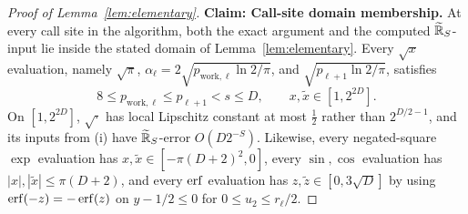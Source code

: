 \begin{proof}[Proof of Lemma~\ref{lem:elementary}]
\textbf{Claim: Call-site domain membership.}
At every call site in the algorithm, both the exact argument and the computed $\widetilde{\mathbb{R}}_S$-input lie inside the stated domain of Lemma~\ref{lem:elementary}. Every $\sqrt{x}$ evaluation, namely $\sqrt{\pi}$, $\alpha_\ell = 2\sqrt{p_{\mathrm{work},\ell}\ln 2 / \pi}$, and $\sqrt{p_{\ell+1}\ln 2 / \pi}$, satisfies
\[
  8 \le p_{\mathrm{work},\ell} \le p_{\ell+1} < s \le D, \qquad x, \tilde{x} \in [1, 2^{2D}].
\]
On $[1, 2^{2D}]$, $\sqrt{\cdot}$ has local Lipschitz constant at most $\frac{1}{2}$ rather than $2^{D/2-1}$, and its inputs from (i) have $\widetilde{\mathbb{R}}_S$-error $O(D 2^{-S})$. Likewise, every negated-square $\exp$ evaluation has $x, \tilde{x} \in [-\pi(D+2)^2, 0]$, every $\sin, \cos$ evaluation has $|x|, |\tilde{x}| \le \pi(D+2)$, and every $\operatorname{erf}$ evaluation has $z, \tilde{z} \in [0, 3\sqrt{D}]$ by using $\operatorname{erf}(-z) = -\operatorname{erf}(z)$ on $y - 1/2 \le 0$ for $0 \le u_2 \le r_\ell / 2$.


\end{proof}
